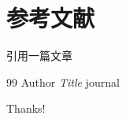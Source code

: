 \documentclass{beamer}
\begin{document}
\subsubsection{}

\section{参考文献}

\begin{frame}
引用一篇文章 \cite{article1} 
     \begin{thebibliography}{99}
        Author
        \emph{Title}
        journal
    \end{thebibliography}
\end{frame}

\begin{frame}
    \begin{center}
        {\Huge\calligra Thanks!}
    \end{center}
\end{frame}
\end{document}
